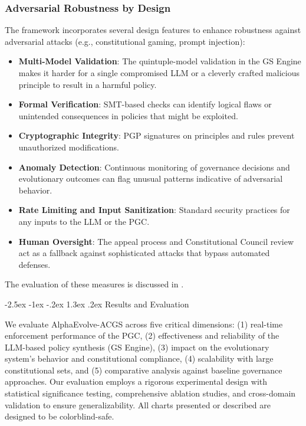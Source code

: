 \documentclass[manuscript,screen,review,anonymous,9pt]{acmart}
\makeatletter
\renewcommand\section{\@startsection{section}{1}{\z@}%
  {-2.5ex \@plus -1ex \@minus -.2ex}%
  {1.3ex \@plus.2ex}%
  {\normalfont\Large\bfseries}}
\makeatother
\begin{document}
\subsubsection{Adversarial Robustness by Design}
\label{subsubsec:adversarial_robustness_methods}
The framework incorporates several design features to enhance robustness against adversarial attacks (e.g., constitutional gaming, prompt injection):
\begin{itemize}[leftmargin=*,itemsep=1pt,parsep=1pt]
    \item \textbf{Multi-Model Validation}: The quintuple-model validation in the GS Engine makes it harder for a single compromised LLM or a cleverly crafted malicious principle to result in a harmful policy.
    \item \textbf{Formal Verification}: SMT-based checks can identify logical flaws or unintended consequences in policies that might be exploited.
    \item \textbf{Cryptographic Integrity}: PGP signatures on principles and rules prevent unauthorized modifications.
    \item \textbf{Anomaly Detection}: Continuous monitoring of governance decisions and evolutionary outcomes can flag unusual patterns indicative of adversarial behavior.
    \item \textbf{Rate Limiting and Input Sanitization}: Standard security practices for any inputs to the LLM or the PGC.
    \item \textbf{Human Oversight}: The appeal process and Constitutional Council review act as a fallback against sophisticated attacks that bypass automated defenses.
\end{itemize}
The evaluation of these measures is discussed in .

\section{Results and Evaluation}
\label{sec:results}

We evaluate AlphaEvolve-ACGS across five critical dimensions: (1) real-time enforcement performance of the PGC, (2) effectiveness and reliability of the LLM-based policy synthesis (GS Engine), (3) impact on the evolutionary system's behavior and constitutional compliance, (4) scalability with large constitutional sets, and (5) comparative analysis against baseline governance approaches. Our evaluation employs a rigorous experimental design with statistical significance testing, comprehensive ablation studies, and cross-domain validation to ensure generalizability. All charts presented or described are designed to be colorblind-safe.
\end{document}
